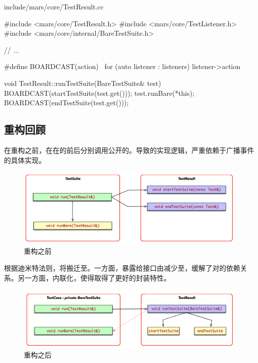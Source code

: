 \begin{content}
\begin{nodiff}{include/mars/core/TestResult.cc}
 \begin{c++}
#include <mars/core/TestResult.h>
#include <mars/core/TestListener.h>
#include <mars/core/internal/BareTestSuite.h>

// ...

#define BOARDCAST(action) \
  for (auto listener : listeners) listener->action

void TestResult::runTestSuite(BareTestSuite& test) {
  BOARDCAST(startTestSuite(test.get()));
  test.runBare(*this);
  BOARDCAST(endTestSuite(test.get()));
}
 \end{c++}
\end{nodiff}

\subsection{重构回顾}

在重构之前，在在的前后分别调用公开的。导致的实现逻辑，严重依赖于广播事件的具体实现。

\begin{figure}[H]
\centering
\includegraphics[width=1.0\textwidth]{figures/xunit/coupling-2.png}
\caption{重构之前}
 \label{fig:coupling-2}
\end{figure}

根据迪米特法则，将搬迁至。一方面，暴露给接口由减少至，缓解了对的依赖关系。另一方面，内联化，使得取得了更好的封装特性。

\begin{figure}[H]
\centering
\includegraphics[width=1.0\textwidth]{figures/xunit/decoupling-2.png}
\caption{重构之后}
 \label{fig:decoupling-2}
\end{figure}


\end{content}
